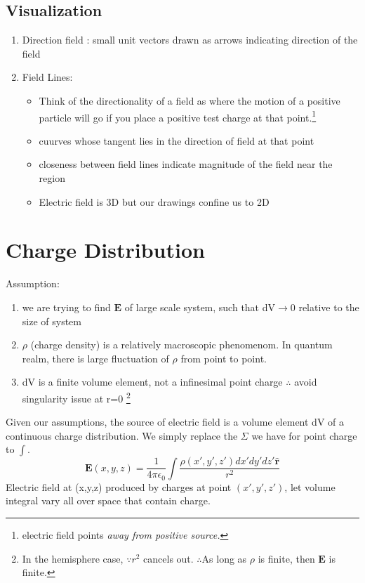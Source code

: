 \documentclass[12 pt , twoside, letterpaper] {article}
\renewcommand{\vec}[1]{\mathbf{#1}}
\let\oldhat\hat
\renewcommand{\hat}[1]{\oldhat{\mathbf{#1}}}
\begin{document}
\subsection{Visualization}
\begin {enumerate}
\item Direction field : small unit vectors drawn as arrows indicating direction of the field
\item Field Lines: 
\begin {itemize}
\item Think of the directionality of a field as where the motion of a positive particle will go if you place a positive test charge at that point.\footnote{electric field points \it away \rm from positive source.}
\item cuurves whose tangent lies in the direction of field at that point
\item closeness between field lines indicate magnitude of the field near  the region
\item Electric field is 3D but our drawings confine us to 2D 
\end{itemize}
\end {enumerate}
\section{Charge Distribution}
Assumption:
\begin{enumerate}
\item we are trying to find $\vec E$ of large scale system, such that dV$\rightarrow$0 relative to the size of system
\item $\rho$ (charge density) is a relatively macroscopic phenomenom. In quantum realm, there is large fluctuation of $\rho$ from point to point.
\item dV is a finite volume element, not a infinesimal point charge $\therefore$ avoid singularity issue at r=0 \footnote{In the hemisphere case, $\because r^2 $ cancels out. $\therefore$As long as $\rho$ is finite, then $\vec E $ is finite.}
\end{enumerate}
Given our assumptions, the source of electric field is a volume element dV of a continuous charge distribution. We simply replace the $\Sigma$ we have for point charge to $\int$.
$$\vec {E} (x,y,z)= \frac {1} {4 \pi \epsilon_0}\int 
\frac{\rho(x\prime,y\prime,z\prime) dx\prime dy\prime dz\prime \hat {r}}{r^2}$$
Electric field at  (x,y,z) produced by charges at point $(x\prime,y\prime,z\prime)$, let volume integral vary all over space that contain charge. 
\end{document}
